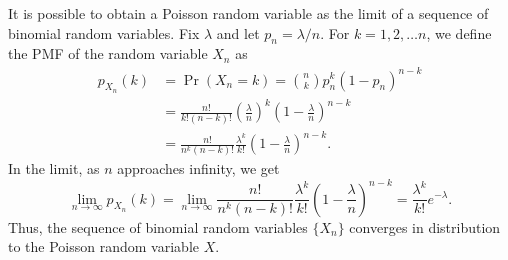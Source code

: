 It is possible to obtain a Poisson random variable as the limit of a sequence of binomial random variables.
Fix $\lambda$ and let $p_n = \lambda/n$.
For $k = 1, 2, \ldots n$, we define the PMF of the random variable $X_n$ as
\begin{equation*}
\begin{split}
p_{X_n} (k) &= \Pr (X_n = k)
= \binom{n}{k} p_n^k (1-p_n)^{n-k} \\
&= \frac{n!}{k!(n-k)!} \left( \frac{\lambda}{n} \right)^k
\left( 1 - \frac{\lambda}{n} \right)^{n-k} \\
&= \frac{n!}{n^k (n-k)!} \frac{\lambda^k}{k!}
\left( 1 - \frac{\lambda}{n} \right)^{n-k} .
\end{split}
\end{equation*}
In the limit, as $n$ approaches infinity, we get
\begin{equation*}
\lim_{n \rightarrow \infty} p_{X_n} (k)
= \lim_{n \rightarrow \infty} \frac{n!}{n^k (n-k)!} \frac{\lambda^k}{k!}
\left( 1 - \frac{\lambda}{n} \right)^{n-k}
= \frac{\lambda^k}{k!} e^{- \lambda} .
\end{equation*}
Thus, the sequence of binomial random variables $\{ X_n \}$ converges in distribution to the Poisson random variable $X$.


